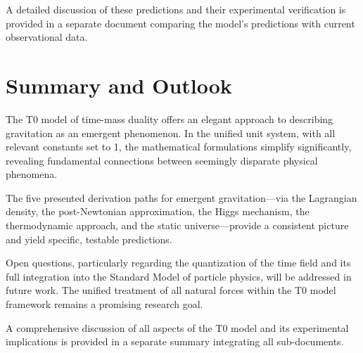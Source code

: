 \documentclass[12pt,a4paper]{article}
\begin{document}
	A detailed discussion of these predictions and their experimental verification is provided in a separate document comparing the model’s predictions with current observational data.
	
	\section{Summary and Outlook}
	The T0 model of time-mass duality offers an elegant approach to describing gravitation as an emergent phenomenon. In the unified unit system, with all relevant constants set to 1, the mathematical formulations simplify significantly, revealing fundamental connections between seemingly disparate physical phenomena.
	
	The five presented derivation paths for emergent gravitation—via the Lagrangian density, the post-Newtonian approximation, the Higgs mechanism, the thermodynamic approach, and the static universe—provide a consistent picture and yield specific, testable predictions.
	
	Open questions, particularly regarding the quantization of the time field and its full integration into the Standard Model of particle physics, will be addressed in future work. The unified treatment of all natural forces within the T0 model framework remains a promising research goal.
	
	A comprehensive discussion of all aspects of the T0 model and its experimental implications is provided in a separate summary integrating all sub-documents.
	
\end{document}
